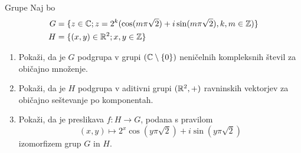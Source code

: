 \begin{frame}{Grupe}
	Naj bo
	\begin{align}
		G &= \{z \in \mathbb{C}; z = 2^k (\cos(m\pi\sqrt{2}) + i \sin(m\pi\sqrt{2}), k, m \in \mathbb{Z})\} \\
		H &= \{(x,y) \in \mathbb{R}^2; x, y \in \mathbb{Z}\}
	\end{align}
	
	\begin{enumerate}
		\item
			Pokaži, da je $G$ podgrupa v grupi $(\mathbb{C} \setminus \{0\})$
			neničelnih kompleksnih števil za običajno množenje.
		\item
			Pokaži, da je $H$ podgrupa v aditivni grupi $(\mathbb{R}^2,+)$
			ravninskih vektorjev za običajno seštevanje po komponentah.
		\item
			Pokaži, da je preslikava $f:H\to G$, podana s pravilom
			$$
			(x,y) \mapsto 2^x \cos(y\pi\sqrt{2}) + i \sin (y\pi\sqrt{2})
			$$
			izomorfizem grup $G$ in $H$.
	\end{enumerate}
\end{frame}
